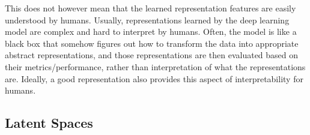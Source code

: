 This does not however mean that the learned representation features are easily understood by humans. Usually, representations learned by the deep learning model are complex and hard to interpret by humans. Often, the model is like a black box that somehow figures out how to transform the data into appropriate abstract representations, and those representations are then evaluated based on their metrics/performance, rather than interpretation of what the representations are. Ideally, a good representation also provides this aspect of interpretability for humans.



\subsection{Latent Spaces}
\label{seq:latent_space}


